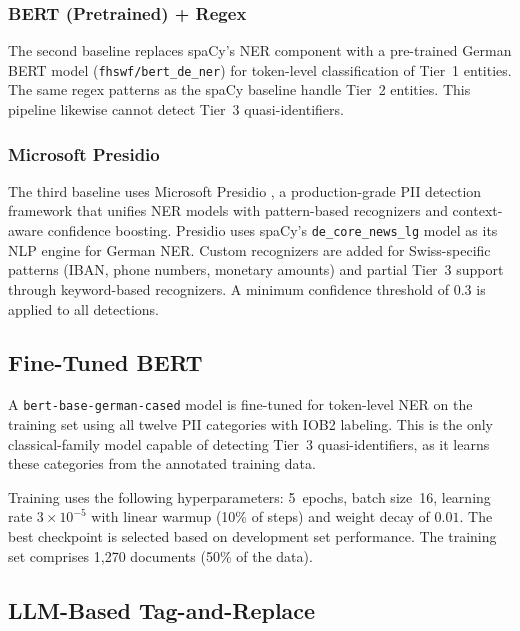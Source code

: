 \subsubsection{BERT (Pretrained) + Regex}

The second baseline replaces spaCy's NER component with a pre-trained German
BERT model (\texttt{fhswf/bert\_de\_ner}) for token-level classification of
Tier~1 entities. The same regex patterns as the spaCy baseline handle Tier~2
entities. This pipeline likewise cannot detect Tier~3 quasi-identifiers.

\subsubsection{Microsoft Presidio}

The third baseline uses Microsoft Presidio \citep{microsoft2024presidio}, a
production-grade PII detection framework that unifies NER models with
pattern-based recognizers and context-aware confidence boosting. Presidio uses
spaCy's \texttt{de\_core\_news\_lg} model as its NLP engine for German NER.
Custom recognizers are added for Swiss-specific patterns (IBAN, phone numbers,
monetary amounts) and partial Tier~3 support through keyword-based recognizers.
A minimum confidence threshold of $0.3$ is applied to all detections.


\subsection{Fine-Tuned BERT}
\label{sec:bert_finetuned}

A \texttt{bert-base-german-cased} model is fine-tuned for token-level NER on
the training set using all twelve PII categories with IOB2 labeling. This is the
only classical-family model capable of detecting Tier~3 quasi-identifiers,
as it learns these categories from the annotated training data.

Training uses the following hyperparameters: 5~epochs, batch size~16,
learning rate $3 \times 10^{-5}$ with linear warmup (10\% of steps) and weight
decay of $0.01$. The best checkpoint is selected based on development set
performance. The training set comprises 1{,}270 documents (50\% of the data).


\subsection{LLM-Based Tag-and-Replace}
\label{sec:llm_tag_replace}

